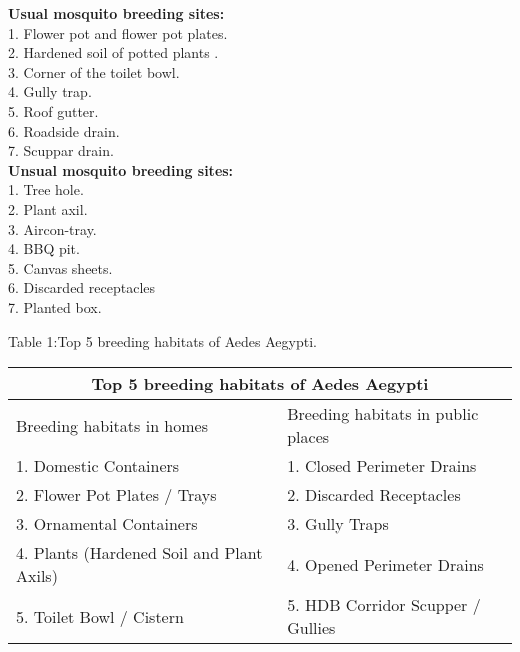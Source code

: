 \documentclass[11pt]{exam}
\begin{document}
\begin{questions}
\begin{enumerate}
  \textbf{Usual mosquito breeding sites:\\ }             
  1. Flower pot and flower pot plates. \\     
  2. Hardened soil of potted plants .\\       
  3. Corner of the toilet bowl. \\
  4. Gully trap. \\
  5. Roof gutter. \\
  6. Roadside drain. \\
  7. Scuppar drain. \\ 
    
  \textbf{Unsual mosquito breeding sites:\\} 
  1. Tree hole. \\
  2. Plant axil. \\
  3. Aircon-tray. \\
  4. BBQ pit. \\
  5. Canvas sheets. \\
  6. Discarded receptacles \\
  7. Planted box. \\

\end{enumerate}
Table 1:Top 5 breeding habitats of Aedes Aegypti. \\

\begin{tabular}{ |p{7cm}|p{7cm}| }
\hline
\multicolumn{2}{|c|}{\textbf{Top 5 breeding habitats of Aedes Aegypti}} \\
\hline
Breeding habitats in homes & Breeding habitats in public places   \\
\hline
1. Domestic Containers & 1. Closed Perimeter Drains\\
2. Flower Pot Plates / Trays & 2. Discarded Receptacles\\
3. Ornamental Containers & 3. Gully Traps \\
4. Plants (Hardened Soil and Plant Axils) & 4. Opened Perimeter Drains\\
5. Toilet Bowl / Cistern & 5. HDB Corridor Scupper / Gullies \\
\hline
\end{tabular} \\ \\


\end{questions}
\end{document}
